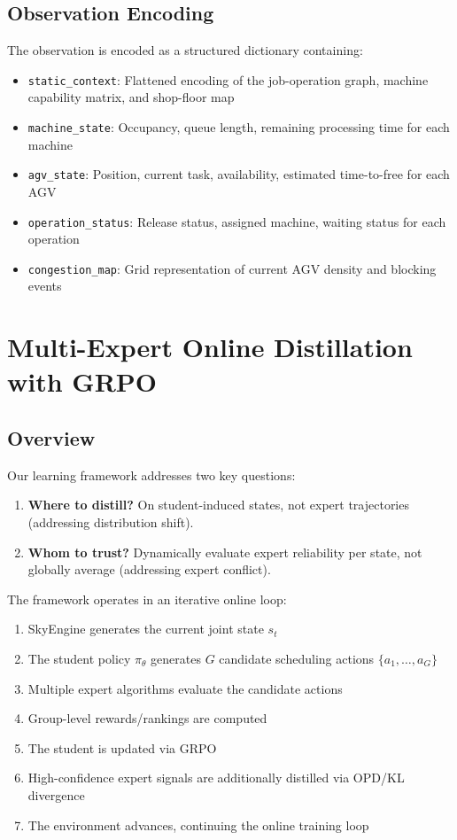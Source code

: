 \documentclass[11pt,a4paper]{article}
\begin{document}
\subsection{Observation Encoding}

The observation is encoded as a structured dictionary containing:

\begin{itemize}[leftmargin=*]
    \item \texttt{static\_context}: Flattened encoding of the job-operation graph, machine capability matrix, and shop-floor map
    \item \texttt{machine\_state}: Occupancy, queue length, remaining processing time for each machine
    \item \texttt{agv\_state}: Position, current task, availability, estimated time-to-free for each AGV
    \item \texttt{operation\_status}: Release status, assigned machine, waiting status for each operation
    \item \texttt{congestion\_map}: Grid representation of current AGV density and blocking events
\end{itemize}


\section{Multi-Expert Online Distillation with GRPO}
\label{sec:method}

\subsection{Overview}

Our learning framework addresses two key questions:
\begin{enumerate}[leftmargin=*]
    \item \textbf{Where to distill?} On student-induced states, not expert trajectories (addressing distribution shift).
    \item \textbf{Whom to trust?} Dynamically evaluate expert reliability per state, not globally average (addressing expert conflict).
\end{enumerate}

The framework operates in an iterative online loop:

\begin{enumerate}[leftmargin=*]
    \item SkyEngine generates the current joint state $s_t$
    \item The student policy $\pi_\theta$ generates $G$ candidate scheduling actions $\{a_1, \ldots, a_G\}$
    \item Multiple expert algorithms evaluate the candidate actions
    \item Group-level rewards/rankings are computed
    \item The student is updated via GRPO
    \item High-confidence expert signals are additionally distilled via OPD/KL divergence
    \item The environment advances, continuing the online training loop
\end{enumerate}
\end{document}

